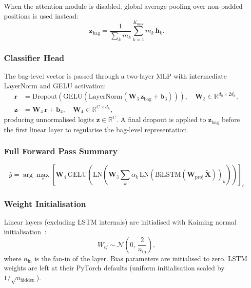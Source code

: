 \documentclass[11pt,a4paper]{article}
\begin{document}
When the attention module is disabled, global average pooling over non-padded
positions is used instead:
\begin{equation}
  \mathbf{z}_{\text{bag}} = \frac{1}{\sum_k m_k} \sum_{k=1}^{K_{\max}} m_k \,\bar{\mathbf{h}}_k.
\end{equation}

\subsubsection{Classifier Head}

The bag-level vector is passed through a two-layer MLP with intermediate
LayerNorm and GELU activation:
\begin{align}
  \mathbf{r} &= \text{Dropout}\!\left(\text{GELU}\!\left(\text{LayerNorm}\!\left(\mathbf{W}_3 \,\mathbf{z}_{\text{bag}} + \mathbf{b}_3\right)\right)\right),
  \quad \mathbf{W}_3 \in \mathbb{R}^{d_h \times 2d_h}, \\
  \mathbf{z} &= \mathbf{W}_4 \,\mathbf{r} + \mathbf{b}_4,
  \quad \mathbf{W}_4 \in \mathbb{R}^{C \times d_h},
\end{align}
producing unnormalised logits $\mathbf{z} \in \mathbb{R}^C$.
A final dropout is applied to $\mathbf{z}_{\text{bag}}$ before the first linear
layer to regularise the bag-level representation.

\subsubsection{Full Forward Pass Summary}

\begin{equation}
\boxed{
  \hat{y} = \arg\max_c \left[\mathbf{W}_4\,\text{GELU}\!\left(\text{LN}\!\left(\mathbf{W}_3 \sum_k \alpha_k\,\text{LN}\!\left(\text{BiLSTM}\!\left(\mathbf{W}_{\text{proj}}\,\tilde{\mathbf{X}}\right)\right)_k\right)\right)\right]_c
}
\end{equation}

\subsubsection{Weight Initialisation}

Linear layers (excluding LSTM internals) are initialised with Kaiming normal
initialisation~\cite{he2015}:
\begin{equation}
  W_{ij} \sim \mathcal{N}\!\left(0,\, \frac{2}{n_{\text{in}}}\right),
\end{equation}
where $n_{\text{in}}$ is the fan-in of the layer. Bias parameters are
initialised to zero. LSTM weights are left at their PyTorch defaults
(uniform initialisation scaled by $1/\sqrt{n_{\text{hidden}}}$).
\end{document}
